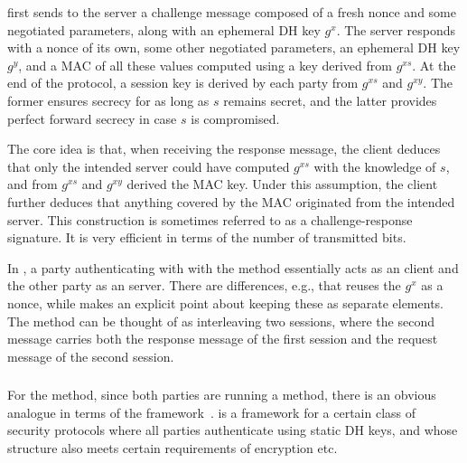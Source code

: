 first sends to the server a {challenge} message composed of a fresh nonce and some negotiated parameters, along with an {ephemeral DH} key $g^{x}$. The server responds with a nonce of its own, some other negotiated parameters, an {ephemeral DH} key $g^{y}$, and a MAC of all these values computed using a key derived from $g^{xs}$. At the end of the protocol, a session key is derived {by each party} from $g^{xs}$ and $g^{xy}$. The former ensures secrecy for as long as $s$ {remains secret}, and the latter provides perfect forward secrecy in case $s$ is compromised. {The core idea is that, when receiving the response message, the client deduces that only the intended server could have computed $g^{xs}$ with the knowledge of $s$,  and from $g^{xs}$ and $g^{xy}$ derived the MAC key.  Under this assumption, the client further deduces that anything covered by the MAC originated from the intended server. This construction is sometimes referred to as a challenge-response signature. It is very efficient in terms of the number of transmitted bits.

{In} \mEdhoc, a party authenticating with with the \mStat{} method essentially acts as an \mOptls{} client and the other party as an \mOptls{} server. There are differences, e.g., that \mEdhoc{} reuses
the $g^x$ as a nonce, while \mOptls{} makes an explicit point about keeping these as separate elements.  The \mStatStat{} method can be thought of as interleaving two \mOptls{} sessions{, where the second \mEdhoc{} message carries both the response message of the first \mOptls{} session and the request message of the second \mOptls{} session.}

\subsubsection{\mNoise{}}
For the \mStatStat{} method, since both parties are running a \mStat{} method,
there is an obvious analogue in terms of the \mNoise{}
framework~\cite{perrin2016noise}. \mNoise{} is a framework for a certain class
of security protocols where all parties {authenticate} using
static DH keys, and whose structure also meets certain requirements of encryption etc. 

}
